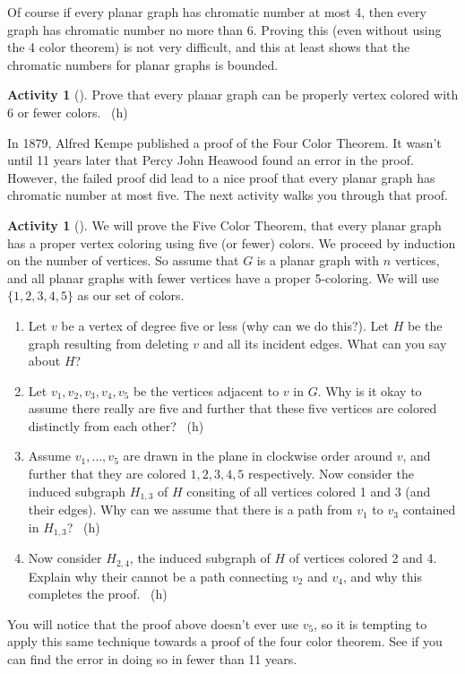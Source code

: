 \documentclass[10pt,]{book}
\theoremstyle{plain}
\theoremstyle{definition}
\theoremstyle{definition}
\theoremstyle{definition}
\newtheorem{activity}[project]{Activity}
\numberwithin{equation}{chapter}
\begin{document}
\par
\hypertarget{p-348}{}%
Of course if every planar graph has chromatic number at most 4, then every graph has chromatic number no more than 6.  Proving this (even without using the 4 color theorem) is not very difficult, and this at least shows that the chromatic numbers for planar graphs is bounded.%
\begin{activity}[]\label{activity-31}
\hypertarget{p-349}{}%
Prove that every planar graph can be properly vertex colored with 6 or fewer colors.%
~{\tiny (h)}\end{activity}
\hypertarget{p-351}{}%
In 1879, Alfred Kempe published a proof of the Four Color Theorem.  It wasn't until 11 years later that Percy John Heawood found an error in the proof.  However, the failed proof did lead to a nice proof that every planar graph has chromatic number at most five.  The next activity walks you through that proof.%
\begin{activity}[]\label{activity-32}
\hypertarget{p-352}{}%
We will prove the Five Color Theorem, that every planar graph has a proper vertex coloring using five (or fewer) colors.  We proceed by induction on the number of vertices.  So assume that \(G\) is a planar graph with \(n\) vertices, and all planar graphs with fewer vertices have a proper 5-coloring.  We will use \(\{1,2,3,4,5\}\) as our set of colors.%
\begin{enumerate}[font=\bfseries,label=(\alph*),ref=\alph*]
\item\label{task-48} \hypertarget{p-353}{}%
Let \(v\) be a vertex of degree five or less (why can we do this?).  Let \(H\) be the graph resulting from deleting \(v\) and all its incident edges.  What can you say about \(H\)?%
\item\label{task-49} \hypertarget{p-354}{}%
Let \(v_1, v_2, v_3, v_4, v_5\) be the vertices adjacent to \(v\) in \(G\).  Why is it okay to assume there really are five and further that these five vertices are colored distinctly from each other?%
~{\tiny (h)}\item\label{task-50} \hypertarget{p-356}{}%
Assume \(v_1, \ldots, v_5\) are drawn in the plane in clockwise order around \(v\), and further that they are colored \(1,2,3,4,5\) respectively.  Now consider the induced subgraph \(H_{1,3}\) of \(H\) consiting of all vertices colored 1 and 3 (and their edges).  Why can we assume that there is a path from \(v_1\) to \(v_3\) contained in \(H_{1,3}\)?%
~{\tiny (h)}\item\label{task-51} \hypertarget{p-358}{}%
Now consider \(H_{2,4}\), the induced subgraph of \(H\) of vertices colored 2 and 4.  Explain why their cannot be a path connecting \(v_2\) and \(v_4\), and why this completes the proof.%
~{\tiny (h)}\end{enumerate}
\end{activity}
\hypertarget{p-360}{}%
You will notice that the proof above doesn't ever use \(v_5\), so it is tempting to apply this same technique towards a proof of the four color theorem.  See if you can find the error in doing so in fewer than 11 years.%
\typeout{************************************************}
\typeout{************************************************}
\end{document}
